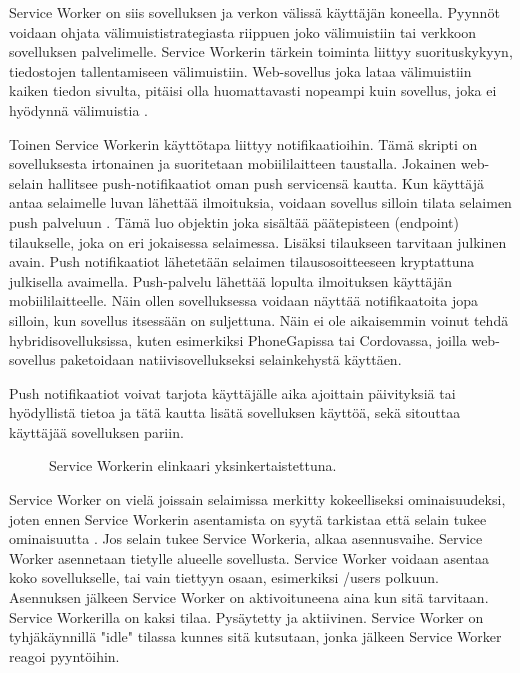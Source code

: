 \documentclass{tktltiki}
\begin{document}
Service Worker on siis sovelluksen ja verkon välissä käyttäjän koneella. Pyynnöt voidaan ohjata välimuististrategiasta riippuen joko välimuistiin tai verkkoon sovelluksen palvelimelle. Service Workerin tärkein toiminta liittyy suorituskykyyn, tiedostojen tallentamiseen välimuistiin. Web-sovellus joka lataa välimuistiin kaiken tiedon sivulta, pitäisi olla huomattavasti nopeampi kuin sovellus, joka ei hyödynnä välimuistia \cite{Walton}.

Toinen Service Workerin käyttötapa liittyy notifikaatioihin. Tämä skripti on sovelluksesta irtonainen ja suoritetaan mobiililaitteen taustalla. Jokainen web-selain hallitsee push-notifikaatiot oman push servicensä kautta. Kun käyttäjä antaa selaimelle luvan lähettää ilmoituksia, voidaan sovellus silloin tilata selaimen push palveluun \cite{Googleb}. Tämä luo objektin joka sisältää päätepisteen (endpoint) tilaukselle, joka on eri jokaisessa selaimessa. Lisäksi tilaukseen tarvitaan julkinen avain. Push notifikaatiot lähetetään selaimen tilausosoitteeseen kryptattuna julkisella avaimella. Push-palvelu lähettää lopulta ilmoituksen käyttäjän mobiililaitteelle. Näin ollen sovelluksessa voidaan näyttää notifikaatoita jopa silloin, kun sovellus itsessään on suljettuna. Näin ei ole aikaisemmin voinut tehdä hybridisovelluksissa, kuten esimerkiksi PhoneGapissa tai Cordovassa, joilla web-sovellus paketoidaan natiivisovellukseksi selainkehystä käyttäen.

Push notifikaatiot voivat tarjota käyttäjälle aika ajoittain päivityksiä tai hyödyllistä tietoa ja tätä kautta lisätä sovelluksen käyttöä, sekä sitouttaa käyttäjää sovelluksen pariin. \cite{8441701}

\begin{figure}[h]
\begin{center}
\caption{Service Workerin elinkaari yksinkertaistettuna. }
\label{Service workerin elinkaari}
\end{center}
\end{figure}
\clearpage

Service Worker on vielä joissain selaimissa merkitty kokeelliseksi ominaisuudeksi, joten ennen Service Workerin asentamista on syytä tarkistaa että selain tukee ominaisuutta \cite{hiltunen2018creating}. Jos selain tukee Service Workeria, alkaa asennusvaihe. Service Worker asennetaan tietylle alueelle sovellusta. Service Worker voidaan asentaa koko sovellukselle, tai vain tiettyyn osaan, esimerkiksi /users polkuun. Asennuksen jälkeen Service Worker on aktivoituneena aina kun sitä tarvitaan. Service Workerilla on kaksi tilaa. Pysäytetty ja aktiivinen. Service Worker on tyhjäkäynnillä "idle" tilassa kunnes sitä kutsutaan, jonka jälkeen Service Worker reagoi pyyntöihin.  
\end{document}
